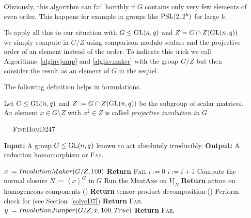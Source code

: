 \begin{Rem}
    Obviously, this algorithm can fail horribly if $G$ contains only
    very few elements of even order. This happens for example in
    groups like $\PSL(2,2^k)$ for large $k$.
\end{Rem}

To apply all this to our situation with $G \le \GL(n,q)$ and
$Z = G \cap Z(\GL(n,q))$ we simply compute in $G/Z$ using
comparison modulo scalars and 
the projective order of an element instead of the order.
To indicate this trick we call Algorithms~\ref{alginvjump} and
\ref{alginvmaker} with the group $G/Z$ but then consider the result as
an element of $G$ in the sequel.

The following definition helps in formulations.

\begin{Def}
%
Let $G \le \GL(n,q)$ and $Z := G \cap Z(\GL(n,q))$ be the subgroup of scalar
matrices. An element $x \in G \setminus Z$ with $x^2 \in Z$ is
called \emph{projective involution in $G$}.
\end{Def}

\begin{algorithm}
\caption{$\quad$ \textsc{FindHomD247}}
%
\label{algreductionD24}
\begin{algorithmic}
\STATE \textbf{Input:} A group $G \le \GL(n,q)$ known to act absolutely
irreducibly.
\STATE \textbf{Output:} A reduction homomorphism or \textsc{Fail}.

\smallskip
\STATE $x := \textsc{InvolutionMaker}(G/Z,100)$
    \STATE \textbf{Return} \textsc{Fail}
\ENDIF
\STATE $i := 0$
    \STATE $i := i + 1$
    \STATE Compute the normal closure $N := \left< x \right>^G$ in $G$
    \STATE Run the MeatAxe on $V|_N$
            \STATE \textbf{Return} action on homogeneous components ()
            \STATE \textbf{Return} tensor product decomposition ()
        \ENDIF
    \ELSE 
        \STATE Perform check for  (see Section~\ref{solveD7})
    \ENDIF
        \STATE \textbf{Return} \textsc{Fail}
    \ENDIF
    \STATE $y := \textsc{InvolutionJumper}(G/Z,x,100,\textsc{True})$
        \STATE \textbf{Return} \textsc{Fail}
    \ENDIF
\ENDWHILE
\end{algorithmic}
\end{algorithm}

